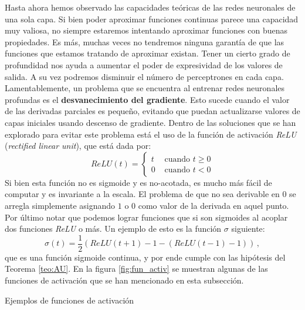 Hasta ahora hemos observado las capacidades teóricas de las redes neuronales de una sola capa. Si bien poder aproximar funciones continuas parece una capacidad muy valiosa, no siempre estaremos intentando aproximar funciones con buenas propiedades. Es más, muchas veces no tendremos ninguna garantía de que las funciones que estamos tratando de aproximar existan. Tener un cierto grado de profundidad nos ayuda a aumentar el poder de expresividad de los valores de salida. A su vez podremos disminuir el número de perceptrones en cada capa.
\newp Lamentablemente, un problema que se encuentra al entrenar redes neuronales profundas es el \textbf{desvanecimiento del gradiente}. Esto sucede cuando el valor de las derivadas parciales es pequeño, evitando que puedan actualizarse valores de capas iniciales usando descenso de gradiente. Dentro de las soluciones que se han explorado para evitar este problema está el uso de la función de activación \textit{ReLU} (\textit{rectified linear unit}), que está dada por:
$$ ReLU(t) = \begin{cases}
t & \text{ cuando }t\geq0 \\
0 & \text{ cuando }t<0
\end{cases}$$
Si bien esta función no es sigmoide y es no-acotada, es mucho más fácil de computar y es invariante a la escala. El problema de que no sea derivable en $0$ se arregla simplemente asignando $1$ o $0$ como valor de la derivada en aquel punto. Por último notar que podemos lograr funciones que si son sigmoides al acoplar dos funciones \textit{ReLU} o más. Un ejemplo de esto es la función $\sigma$ siguiente:
$$ \sigma(t) = \frac{1}{2}(ReLU(t+1)-1-(ReLU(t-1)-1))\,,$$
que es una función sigmoide continua, y por ende cumple con las hipótesis del Teorema \ref{teo:AU}. En la figura \ref{fig:fun_activ} se muestran algunas de las funciones de activación que se han mencionado en esta subsección.
\begin{images}[\label{fig:fun_activ}]{Ejemplos de funciones de activación}
	\imagesnewline
\end{images}



